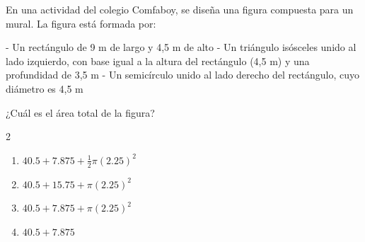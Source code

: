 En una actividad del colegio Comfaboy, se diseña una figura compuesta para un mural. La figura está formada por:

- Un rectángulo de 9 m de largo y 4,5 m de alto  
- Un triángulo isósceles unido al lado izquierdo, con base igual a la altura del rectángulo (4,5 m) y una profundidad de 3,5 m  
- Un semicírculo unido al lado derecho del rectángulo, cuyo diámetro es 4,5 m  

\begin{center}
\end{center}

¿Cuál es el área total de la figura?

\begin{multicols}{2}
\begin{enumerate}[label=\alph*), leftmargin=*]
\item $40.5 + 7.875 + \frac{1}{2}\pi(2.25)^2$
\item $40.5 + 15.75 + \pi(2.25)^2$
\item $40.5 + 7.875 + \pi(2.25)^2$
\item $40.5 + 7.875$
\end{enumerate}
\end{multicols}